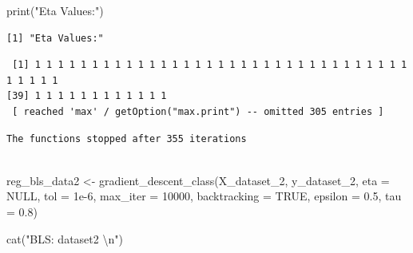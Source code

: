 \documentclass[
  letterpaper,
  DIV=11,
  numbers=noendperiod]{scrartcl}
\newenvironment{Shaded}{\begin{snugshade}}{\end{snugshade}}
\newcommand{\AttributeTok}[1]{\textcolor[rgb]{0.40,0.45,0.13}{#1}}
\newcommand{\ConstantTok}[1]{\textcolor[rgb]{0.56,0.35,0.01}{#1}}
\newcommand{\DecValTok}[1]{\textcolor[rgb]{0.68,0.00,0.00}{#1}}
\newcommand{\FloatTok}[1]{\textcolor[rgb]{0.68,0.00,0.00}{#1}}
\newcommand{\FunctionTok}[1]{\textcolor[rgb]{0.28,0.35,0.67}{#1}}
\newcommand{\NormalTok}[1]{\textcolor[rgb]{0.00,0.23,0.31}{#1}}
\newcommand{\OtherTok}[1]{\textcolor[rgb]{0.00,0.23,0.31}{#1}}
\newcommand{\SpecialCharTok}[1]{\textcolor[rgb]{0.37,0.37,0.37}{#1}}
\newcommand{\StringTok}[1]{\textcolor[rgb]{0.13,0.47,0.30}{#1}}
\begin{document}
\begin{Shaded}
\begin{Highlighting}[]
\FunctionTok{print}\NormalTok{(}\StringTok{"Eta Values:"}\NormalTok{)}
\end{Highlighting}
\end{Shaded}

\begin{verbatim}
[1] "Eta Values:"
\end{verbatim}

\begin{Shaded}
\end{Shaded}

\begin{verbatim}
 [1] 1 1 1 1 1 1 1 1 1 1 1 1 1 1 1 1 1 1 1 1 1 1 1 1 1 1 1 1 1 1 1 1 1 1 1 1 1 1
[39] 1 1 1 1 1 1 1 1 1 1 1 1
 [ reached 'max' / getOption("max.print") -- omitted 305 entries ]
\end{verbatim}

\begin{Shaded}
\end{Shaded}

\begin{verbatim}
The functions stopped after 355 iterations 
 
\end{verbatim}

\begin{Shaded}
\begin{Highlighting}[]
\NormalTok{reg\_bls\_data2 }\OtherTok{\textless{}{-}} \FunctionTok{gradient\_descent\_class}\NormalTok{(X\_dataset\_2, y\_dataset\_2, }\AttributeTok{eta =} \ConstantTok{NULL}\NormalTok{, }\AttributeTok{tol =} \FloatTok{1e{-}6}\NormalTok{, }\AttributeTok{max\_iter =} \DecValTok{10000}\NormalTok{, }\AttributeTok{backtracking =} \ConstantTok{TRUE}\NormalTok{, }\AttributeTok{epsilon =} \FloatTok{0.5}\NormalTok{, }\AttributeTok{tau =} \FloatTok{0.8}\NormalTok{)}

\FunctionTok{cat}\NormalTok{(}\StringTok{"BLS: dataset2 }\SpecialCharTok{\textbackslash{}n}\StringTok{"}\NormalTok{)}
\end{Highlighting}
\end{Shaded}
\end{document}
